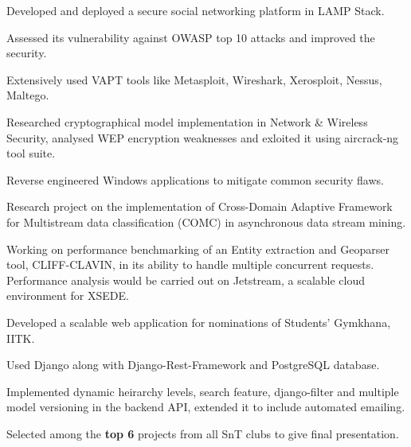 \documentclass[]{deedy-resume-openfont}
\begin{document}
\begin{minipage}[t]{0.70\textwidth}
\vspace{0.1cm}
\vspace{0cm} %
\begin{tightemize}
  \item Developed and deployed a secure social networking platform in LAMP Stack. 
  \item Assessed its vulnerability against OWASP top 10 attacks and improved the security.
  \item Extensively used VAPT tools like Metasploit, Wireshark, Xerosploit, Nessus, Maltego.
  \item	Researched cryptographical model implementation in Network \& Wireless Security, analysed WEP encryption weaknesses and exloited it using aircrack-ng tool suite.
  \item Reverse engineered Windows applications to mitigate common security flaws.
\end{tightemize}

\vspace{0.1cm}
\vspace{0cm} %
\begin{tightemize}
  \item Research project on the implementation of Cross-Domain Adaptive Framework for Multistream data classification (COMC) in asynchronous data stream mining. 
  \item Working on performance benchmarking of an Entity extraction and Geoparser tool, CLIFF-CLAVIN, in its ability to handle multiple concurrent requests. Performance analysis would be carried out on Jetstream, a scalable cloud environment for XSEDE.
\end{tightemize}

\vspace{0.1cm}
\vspace{0cm} %
\begin{tightemize}
  \item Developed a scalable web application for nominations of Students' Gymkhana, IITK.
  \item Used Django along with Django-Rest-Framework and PostgreSQL database.
  \item	Implemented dynamic heirarchy levels, search feature, django-filter and multiple model versioning in the backend API, extended it to include automated emailing.
  \item	Selected among the \textbf{top 6} projects from all SnT clubs to give final presentation.
\end{tightemize}


\end{minipage}
\end{document}
